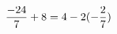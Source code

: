 \documentclass[preview]{standalone}
\begin{document}
\begin{align*}
\special{dvisvgm:raw <g id='unique000'>}\frac{-24}{7} + 8 = 4 - 2 (- \frac{2}{7})\special{dvisvgm:raw </g>}
\end{align*}
\end{document}
